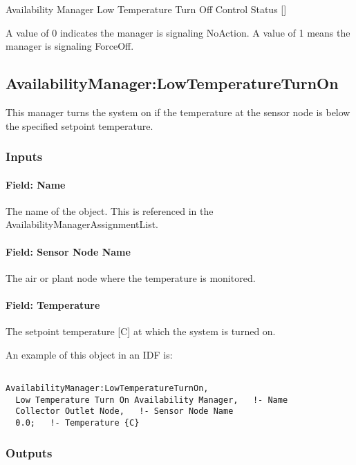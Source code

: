 Availability Manager Low Temperature Turn Off Control Status {[]}

A value of 0 indicates the manager is signaling NoAction. A value of 1 means the manager is signaling ForceOff.

\subsection{AvailabilityManager:LowTemperatureTurnOn}\label{availabilitymanagerlowtemperatureturnon}

This manager turns the system on if the temperature at the sensor node is below the specified setpoint temperature.

\subsubsection{Inputs}\label{inputs-8-025}

\paragraph{Field: Name}\label{field-name-7-021}

The name of the object. This is referenced in the AvailabilityManagerAssignmentList.

\paragraph{Field: Sensor Node Name}\label{field-sensor-node-name-3}

The air or plant node where the temperature is monitored.

\paragraph{Field: Temperature}\label{field-temperature-3}

The setpoint temperature {[}C{]} at which the system is turned on.

An example of this object in an IDF is:

\begin{lstlisting}

AvailabilityManager:LowTemperatureTurnOn,
  Low Temperature Turn On Availability Manager,   !- Name
  Collector Outlet Node,   !- Sensor Node Name
  0.0;   !- Temperature {C}
\end{lstlisting}

\subsubsection{Outputs}\label{outputs-7-010}

